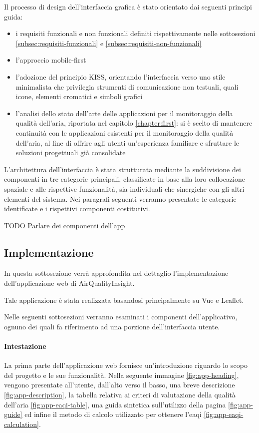 Il processo di design dell'interfaccia grafica è stato orientato dai seguenti principi guida:
\begin{itemize}
  \item i requisiti funzionali e non funzionali definiti rispettivamente nelle sottosezioni
        \ref{subsec:requisiti-funzionali} e \ref{subsec:requisiti-non-funzionali}
  \item l'approccio mobile-first
  \item l'adozione del principio KISS, orientando l'interfaccia verso uno stile minimalista che privilegia strumenti
        di comunicazione non testuali, quali icone, elementi cromatici e simboli grafici
  \item l'analisi dello stato dell'arte delle applicazioni per il monitoraggio della qualità dell'aria,
        riportata nel capitolo \ref{chapter:first}: si è scelto di mantenere continuità
        con le applicazioni esistenti per il monitoraggio della qualità dell'aria, al fine di offrire agli utenti
        un'esperienza familiare e sfruttare le soluzioni progettuali già consolidate
\end{itemize}
L'architettura dell'interfaccia è stata strutturata mediante la suddivisione dei componenti
in tre categorie principali, classificate in base alla loro collocazione spaziale e alle rispettive funzionalità,
sia individuali che sinergiche con gli altri elementi del sistema.
Nei paragrafi seguenti verranno presentate le categorie identificate e i rispettivi componenti costitutivi.

TODO Parlare dei componenti dell'app

\subsection{Implementazione}

In questa sottosezione verrà approfondita nel dettaglio l'implementazione dell'applicazione web di AirQualityInsight.

Tale applicazione è stata realizzata basandosi principalmente su Vue e Leaflet.

Nelle seguenti sottosezioni verranno esaminati i componenti dell'applicativo, ognuno dei quali fa riferimento
ad una porzione dell'interfaccia utente.

\paragraph{Intestazione}

La prima parte dell'applicazione web fornisce un'introduzione riguardo lo scopo del progetto e le sue funzionalità.
Nella seguente immagine \ref{fig:app-heading}, vengono presentate all'utente, dall'alto verso il basso,
una breve descrizione \ref{fig:app-description},
la tabella relativa ai criteri di valutazione della qualità dell'aria \ref{fig:app-eaqi-table},
una guida sintetica sull'utilizzo della pagina \ref{fig:app-guide} ed infine
il metodo di calcolo utilizzato per ottenere l'\acrfull{eaqi} \ref{fig:app-eaqi-calculation}.

